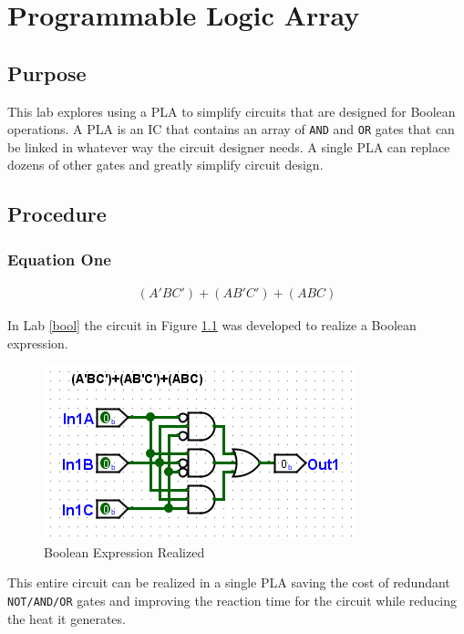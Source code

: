 \chapter{Programmable Logic Array}\label{pla}

\section{Purpose}

This lab explores using a \ac{PLA} to simplify circuits that are designed for Boolean operations. A \ac{PLA} is an \ac{IC} that contains an array of \texttt{AND} and \texttt{OR} gates that can be linked in whatever way the circuit designer needs. A single \ac{PLA} can replace dozens of other gates and greatly simplify circuit design.

\section{Procedure}

\subsection{Equation One}

\begin{align}
	\label{eq:pla-01}
	(A'BC')+(AB'C')+(ABC)
\end{align}

In Lab \ref{bool} the circuit in Figure \ref{fig:pla-01} was developed to realize a Boolean expression.

\begin{figure}[H]
	\centering
	\includegraphics[width=\maxwidth{.95\linewidth}]{gfx/bool-04}
	\caption{Boolean Expression Realized}
	\label{fig:pla-01}
\end{figure}

This entire circuit can be realized in a single \ac{PLA} saving the cost of redundant \texttt{NOT/AND/OR} gates and improving the reaction time for the circuit while reducing the heat it generates.

